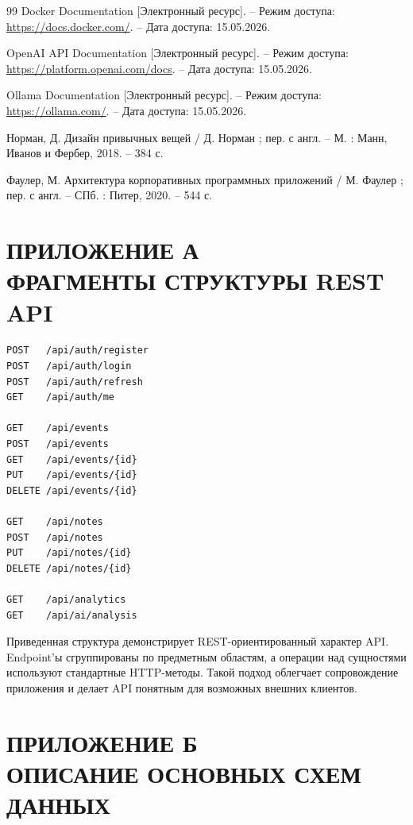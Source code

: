 \documentclass[14pt,a4paper]{extreport}
\begin{document}
\begin{thebibliography}{99}
Docker Documentation [Электронный ресурс]. -- Режим доступа: \url{https://docs.docker.com/}. -- Дата доступа: 15.05.2026.

OpenAI API Documentation [Электронный ресурс]. -- Режим доступа: \url{https://platform.openai.com/docs}. -- Дата доступа: 15.05.2026.

Ollama Documentation [Электронный ресурс]. -- Режим доступа: \url{https://ollama.com/}. -- Дата доступа: 15.05.2026.

Норман, Д. Дизайн привычных вещей / Д. Норман ; пер. с англ. -- М. : Манн, Иванов и Фербер, 2018. -- 384 с.

Фаулер, М. Архитектура корпоративных программных приложений / М. Фаулер ; пер. с англ. -- СПб. : Питер, 2020. -- 544 с.

\end{thebibliography}

\appendix

\chapter*{ПРИЛОЖЕНИЕ А\\ФРАГМЕНТЫ СТРУКТУРЫ REST API}

\begin{Verbatim}[fontsize=\small]
POST   /api/auth/register
POST   /api/auth/login
POST   /api/auth/refresh
GET    /api/auth/me

GET    /api/events
POST   /api/events
GET    /api/events/{id}
PUT    /api/events/{id}
DELETE /api/events/{id}

GET    /api/notes
POST   /api/notes
PUT    /api/notes/{id}
DELETE /api/notes/{id}

GET    /api/analytics
GET    /api/ai/analysis
\end{Verbatim}

Приведенная структура демонстрирует REST-ориентированный характер API. Endpoint'ы сгруппированы по предметным областям, а операции над сущностями используют стандартные HTTP-методы. Такой подход облегчает сопровождение приложения и делает API понятным для возможных внешних клиентов.

\chapter*{ПРИЛОЖЕНИЕ Б\\ОПИСАНИЕ ОСНОВНЫХ СХЕМ ДАННЫХ}
\end{document}
